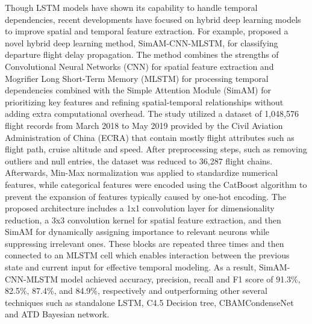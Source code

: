 \documentclass[twoside,11pt]{article}
\begin{document}
Though LSTM models have shown its capability to handle temporal dependencies, recent developments have focused on hybrid deep learning models to improve spatial and temporal feature extraction. For example, \cite{qu2023flight} proposed a novel hybrid deep learning method, SimAM-CNN-MLSTM, for classifying departure flight delay propagation. The method combines the strengths of Convolutional Neural Networks (CNN) for spatial feature extraction and Mogrifier Long Short-Term Memory (MLSTM) for processing temporal dependencies combined with the Simple Attention Module (SimAM) for prioritizing key features and refining spatial-temporal relationships without adding extra computational overhead. The study utilized a dataset of 1,048,576 flight records from March 2018 to May 2019 provided by the Civil Aviation Administration of China (ECRA) that contain mostly flight attributes such as flight path, cruise altitude and speed. After preprocessing steps, such as removing outliers and null entries, the dataset was reduced to 36,287 flight chains. Afterwards, Min-Max normalization was applied to standardize numerical features, while categorical features were encoded using the CatBoost algorithm to prevent the expansion of features typically caused by one-hot encoding. The proposed architecture includes a 1x1 convolution layer for dimensionality reduction, a 3x3 convolution kernel for spatial feature extraction, and then SimAM for dynamically assigning importance to relevant neurons while suppressing irrelevant ones. These blocks are repeated three times and then connected to an MLSTM cell which enables interaction between the previous state and current input for effective temporal modeling. As a result, SimAM-CNN-MLSTM model achieved accuracy, precision, recall and F1 score of 91.3\%, 82.5\%, 87.4\%, and 84.9\%, respectively and outperforming other several techniques such as standalone LSTM, C4.5 Decision tree, CBAMCondenseNet and ATD Bayesian network.  
\end{document}
